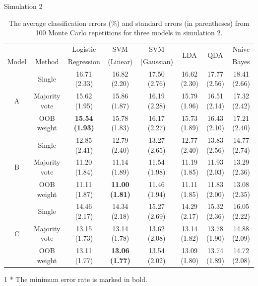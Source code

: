 \documentclass{beamer}
\begin{document}
\begin{frame}{Simulation 2}
	\begin{table}[ht]
		\footnotesize
		\centering
		\caption{The average classification errors (\%) and standard errors (in parentheses) from 100 Monte Carlo repetitions for three models in simulation 2.}\label{t3}
		\tabcolsep=5pt
		\tiny
		\begin{tabular}{cccccccc}
			\hline\hline
			&        & Logistic   & SVM      & SVM        &   \multirow{2}{*}{LDA}  &  \multirow{2}{*}{QDA}   & Naive \\
			Model & Method & Regression & (Linear) & (Gaussian) &  &  & Bayes \\ 
			\hline
			\multirow{3}{*}{A} & Single        & 16.71 (2.33) & 16.82 (2.20) & 17.50 (2.76) & 16.62 (2.30) & 17.77 (2.56) & 18.41 (2.66) \\ 
			& Majority vote & 15.62 (1.95) & 15.86 (1.87) & 16.19 (2.28) & 15.79 (1.96) & 16.51 (2.14) & 17.32 (2.42) \\ 
			& OOB weight    & \textbf{15.54 (1.93)} & 15.78 (1.83) & 16.17 (2.27) & 15.73 (1.89) & 16.43 (2.10) & 17.21 (2.40) \\ 
			\hline
			\multirow{3}{*}{B} & Single        & 12.85 (2.41) & 12.79 (2.40) & 13.27 (2.65) & 12.77 (2.40) & 13.83 (2.56) & 14.77 (2.74) \\ 
			& Majority vote & 11.20 (1.84) & 11.14 (1.89) & 11.54 (1.98) & 11.19 (1.85) & 11.93 (2.03) & 13.29 (2.36) \\  
			& OOB weight    & 11.11 (1.87) & \textbf{11.00 (1.81)} & 11.46 (1.94) & 11.11 (1.85) & 11.83 (2.00) & 13.08 (2.35) \\ 
			\hline
			\multirow{3}{*}{C} & Single        & 14.46 (2.17) & 14.34 (2.18) & 15.27 (2.69) & 14.29 (2.17) & 15.32 (2.36) & 16.05 (2.22) \\ 
			& Majority vote & 13.15 (1.73) & 13.14 (1.78) & 13.62 (2.08) & 13.14 (1.82) & 13.78 (1.90) & 14.88 (2.09) \\  
			& OOB weight    & 13.11 (1.77) & \textbf{13.06 (1.77)} & 13.54 (2.02) & 13.09 (1.80) & 13.74 (1.89) & 14.72 (2.08) \\  
			\hline\hline
		\end{tabular}
		\begin{tablenotes}
			\item[1] * The minimum error rate is marked in bold.
		\end{tablenotes}
	\end{table}
\end{frame}
\end{document}
